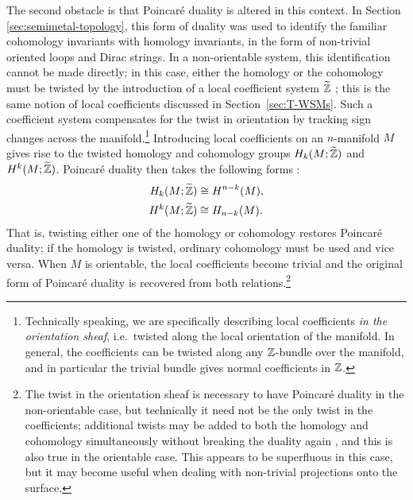 The second obstacle is that Poincaré duality is altered in this context. In Section \ref{sec:semimetal-topology}, this form of duality was used to identify the familiar cohomology invariants with homology invariants, in the form of non-trivial oriented loops and Dirac strings. In a non-orientable system, this identification cannot be made directly; in this case, either the homology or the cohomology must be twisted by the introduction of a local coefficient system $\widetilde{\mathbb{Z}}$ \cite{Whitehead_Homotopy,Hatcher_algebraic-topology}; this is the same notion of local coefficients discussed in Section~\ref{sec:T-WSMs}. Such a coefficient system compensates for the twist in orientation by tracking sign changes across the manifold.\footnote{
	Technically speaking, we are specifically describing local coefficients \emph{in the orientation sheaf}, i.e.\ twisted along the local orientation of the manifold. In general, the coefficients can be twisted along any $\mathbb{Z}$-bundle over the manifold, and in particular the trivial bundle gives normal coefficients in $\mathbb{Z}$.} 
Introducing local coefficients on an $n$-manifold $M$ gives rise to the twisted homology and cohomology groups $H_k(M;\widetilde{\mathbb{Z}})$ and $H^k(M;\widetilde{\mathbb{Z}})$. Poincaré duality then takes the following forms \parencite[Theorem 3H.6]{Hatcher_algebraic-topology}:
\begin{align}
	H_k(M;\widetilde{\mathbb{Z}}) &\cong H^{n-k}(M), \label{eq:twisted-hom-duality}\\
	H^k(M;\widetilde{\mathbb{Z}}) &\cong H_{n-k}(M). \label{eq:twisted-cohom-duality}
\end{align}
That is, twisting either one of the homology or cohomology restores Poincaré duality; if the homology is twisted, ordinary cohomology must be used and vice versa. When $M$ is orientable, the local coefficients become trivial and the original form of Poincaré duality is recovered from both relations.\footnote{
	The twist in the orientation sheaf is necessary to have Poincaré duality in the non-orientable case, but technically it need not be the only twist in the coefficients; additional twists may be added to both the homology and cohomology simultaneously without breaking the duality again \parencite[\S~5.2.2.]{DavisKirk_algebraic-topology}, and this is also true in the orientable case. This appears to be superfluous in this case, but it may become useful when dealing with non-trivial projections onto the surface.}

